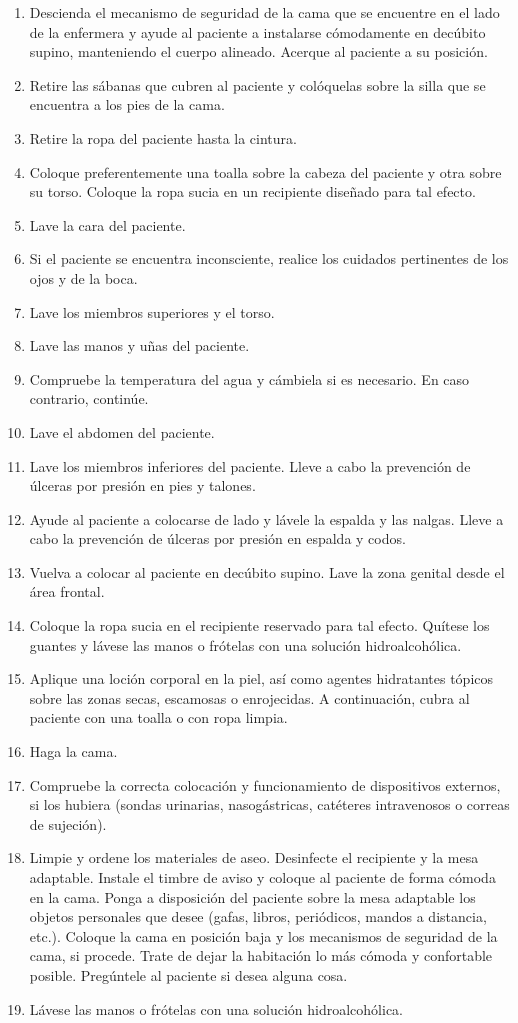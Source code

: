 \begin{enumerate}[topsep=0pt, partopsep=0pt,itemsep=0pt,parsep=0pt]
    \item Descienda el mecanismo de seguridad de la cama que se encuentre en el lado de la enfermera y ayude al paciente a instalarse cómodamente en decúbito supino, manteniendo el cuerpo alineado. Acerque al paciente a su posición.
    \item Retire las sábanas que cubren al paciente y colóquelas sobre la silla que se encuentra a los pies de la cama.
    \item Retire la ropa del paciente hasta la cintura.
    \item Coloque preferentemente una toalla sobre la cabeza del paciente y otra sobre su torso. Coloque la ropa sucia en un recipiente diseñado para tal efecto.
    \item Lave la cara del paciente.
    \item Si el paciente se encuentra inconsciente, realice los cuidados pertinentes de los ojos y de la boca.
    \item Lave los miembros superiores y el torso.
    \item Lave las manos y uñas del paciente.
    \item Compruebe la temperatura del agua y cámbiela si es necesario. En caso contrario, continúe.
    \item Lave el abdomen del paciente.
    \item Lave los miembros inferiores del paciente. Lleve a cabo la prevención de úlceras por presión en pies y talones.
    \item Ayude al paciente a colocarse de lado y lávele la espalda y las nalgas. Lleve a cabo la prevención de úlceras por presión en espalda y codos.
    \item Vuelva a colocar al paciente en decúbito supino. Lave la zona genital desde el área frontal.
    \item Coloque la ropa sucia en el recipiente reservado para tal efecto. Quítese los guantes y lávese las manos o frótelas con una solución hidroalcohólica.
    \item Aplique una loción corporal en la piel, así como agentes hidratantes tópicos sobre las zonas secas, escamosas o enrojecidas. A continuación, cubra al paciente con una toalla o con ropa limpia.
    \item Haga la cama.
    \item Compruebe la correcta colocación y funcionamiento de dispositivos externos, si los hubiera (sondas urinarias, nasogástricas, catéteres intravenosos o correas de sujeción).
    \item Limpie y ordene los materiales de aseo. Desinfecte el recipiente y la mesa adaptable. Instale el timbre de aviso y coloque al paciente de forma cómoda en la cama. Ponga a disposición del paciente sobre la mesa adaptable los objetos personales que desee (gafas, libros, periódicos, mandos a distancia, etc.). Coloque la cama en posición baja y los mecanismos de seguridad de la cama, si procede. Trate de dejar la habitación lo más cómoda y confortable posible. Pregúntele al paciente si desea alguna cosa.
    \item Lávese las manos o frótelas con una solución hidroalcohólica.
\end{enumerate}
